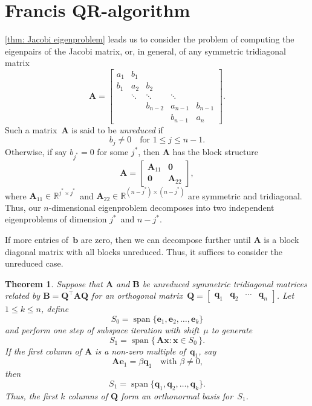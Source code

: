 \documentclass[12pt,a4paper]{article}
\newtheorem{theorem}{Theorem}
\newcommand{\bs}[1]{\boldsymbol{#1}}
\newcommand{\vecspan}{\operatorname{span}}
\begin{document}
\section{Francis QR-algorithm}
\cref{thm: Jacobi eigenproblem} leads us to consider the problem of computing 
the eigenpairs of the Jacobi matrix, or, in general, of any symmetric 
tridiagonal matrix
\[
\bs{A}=\begin{bmatrix}
a_1&b_1   &       &       &\\
b_1&a_2   &b_2    &       &\\
   &\ddots&\ddots &\ddots &\\
   &      &b_{n-2}&a_{n-1}&b_{n-1}\\
   &      &       &b_{n-1}&a_n
\end{bmatrix}.
\]
Such a matrix~$\bs{A}$ is said to be \emph{unreduced} if
\[
b_j\ne0\quad\text{for $1\le j\le n-1$.}
\]
Otherwise, if say $b_{j^*}=0$ for some $j^*$, then $\bs{A}$ has the block 
structure
\[
\bs{A}=\left[\begin{array}{c|c}
\bs{A}_{11}&\bs{0}\\
\hline
\bs{0}&\bs{A}_{22}\end{array}\right],
\]
where $\bs{A}_{11}\in\mathbb{R}^{j^*\times j^*}$~and
$\bs{A}_{22}\in\mathbb{R}^{(n-j^*)\times(n-j^*)}$ are symmetric and tridiagonal.
Thus, our $n$-dimensional eigenproblem decomposes into two independent
eigenproblems of dimension $j^*$~and $n-j^*$.

If more entries of~$\bs{b}$ are zero, then we can decompose further until
$\bs{A}$ is a block diagonal matrix with all blocks unreduced.  Thus, it
suffices to consider the unreduced case.

\begin{theorem}\label{thm: implicit Q}
Suppose that $\bs{A}$ and $\bs{B}$ be unreduced
symmetric tridiagonal matrices related by $\bs{B}=\bs{Q}^\top\bs{A}\bs{Q}$ for
an orthogonal
matrix~$\bs{Q}=\begin{bmatrix}\bs{q}_1&\bs{q}_2&\cdots&\bs{q}_n\end{bmatrix}$.
Let $1\le k\le n$, define
\[
S_0=\vecspan\{\bs{e}_1,\bs{e}_2,\ldots,\bs{e}_k\}
\]
and perform one step of subspace iteration with shift~$\mu$ to generate
\[
S_1=\vecspan\{\,\bs{A}\bs{x}:\bs{x}\in S_0\,\}.
\]
If the first column of $\bs{A}$ is a non-zero multiple of~$\bs{q}_1$,
say
\[
\bs{A}\bs{e}_1=\beta\bs{q}_1\quad\text{with $\beta\ne0$,}
\]
then
\[
S_1=\vecspan\{\bs{q}_1,\bs{q}_2,\ldots,\bs{q}_k\}.
\]
Thus, the first $k$ columns of $\bs{Q}$ form an orthonormal basis for~$S_1$.
\end{theorem}
\end{document}
